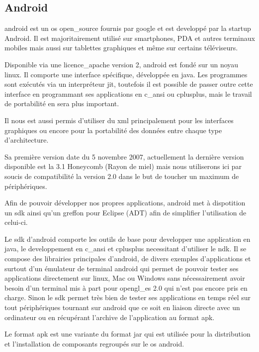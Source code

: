 \subsection{Android}

	\gls{android} est un \gls{os} \gls{open_source} fournis par \gls{google} et est
	developpé par la startup Android.
	Il est majoritairement utilisé sur smartphones, PDA et autres terminaux
	mobiles mais aussi sur tablettes graphiques et même sur certains téléviseurs.
	
	Disponible via une \gls{licence_apache} version 2, \gls{android} est fondé  sur
	un noyau \gls{linux}.
	Il comporte une interface spécifique, développée en \gls{java}.
	Les programmes sont exécutés via un interpréteur \gls{jit}, toutefois il est possible
	de passer outre cette interface en programmant ses applications en \gls{c_ansi} ou \gls{cplusplus},
	mais le travail de portabilité en sera plus important.
	
	Il nous est aussi permis d'utiliser du \gls{xml} principalement pour les interfaces
	graphiques ou encore pour la portabilité des données entre chaque type
	d'architecture.
	
	Sa première version date du 5 novembre 2007, actuellement la dernière version
	disponible est la 3.1 Honeycomb (Rayon de miel) mais nous utiliserons ici par
	soucis de compatibilité la version 2.0 dans le but de toucher un maximum de
	périphériques.
	
	Afin de pouvoir développer nos propres applications, \gls{android} met à
	dispotition un \gls{sdk} ainsi qu'un greffon pour Eclipse
	(ADT) afin de simplifier l'utilisation de celui-ci.
	
	Le \gls{sdk} d'\gls{android} comporte les outils de base pour developper une application en
	\gls{java}, le developpement en \gls{c_ansi} et \gls{cplusplus} necessitant d'utiliser le \gls{ndk}.
	Il se compose des librairies principales d'\gls{android}, de divers exemples
	d'applications et surtout d'un émulateur de terminal \gls{android} qui permet de
	pouvoir tester ses applications directement sur \gls{linux}, Mac ou
	Windows sans nécessairement avoir besoin d'un terminal mis à part pour
	\gls{opengl_es} 2.0 qui n'est pas encore pris en charge. Sinon le \gls{sdk}
	permet très bien de tester ses applications en temps réel sur tout
	périphériques tournant sur \gls{android} que ce soit en liaison directe avec un
	ordinateur ou en récupérant l'archive de l'application au format \gls{apk}.
	
	Le format \gls{apk} est une variante du format
	\gls{jar} qui est utilisée pour la distribution et l'installation de composants
	regroupés sur le \gls{os} \gls{android}.


